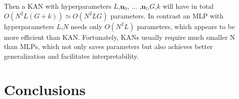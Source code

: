 \documentclass[12pt,a4paper]{article}
\begin{document}
Then a KAN with hyperparameters \textbf{$L$},$\textbf{n}_0$, ... ,$\textbf{n}_l$,\textbf{$G$},\textbf{$k$} will have in total $O(N^2L(G + k))  \simeq O(N^2LG)$ parameters. In contrast an MLP with hyperparameters \textbf{$L$},\textbf{$N$} needs only  $O(N^2L)$ parameters, which appears to be more efficient than KAN. Fortunately, KANs usually require much smaller N than MLPs, which not only saves parameters but also achieves better generalization and facilitates interpretability. 


\section{Conclusions}


\end{document}
